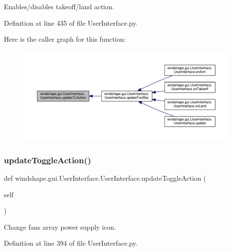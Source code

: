 \begin{DoxyVerb}Enables/disables takeoff/land action.\end{DoxyVerb}
 

Definition at line 435 of file User\+Interface.\+py.

Here is the caller graph for this function\+:\nopagebreak
\begin{figure}[H]
\begin{center}
\leavevmode
\includegraphics[width=350pt]{classwindshape_1_1gui_1_1_user_interface_1_1_user_interface_a26806922c4bfbbbbbffe85dfcf85e614_icgraph}
\end{center}
\end{figure}
\mbox{\label{classwindshape_1_1gui_1_1_user_interface_1_1_user_interface_ad5d42b4891098687b296ef6893d7274d}} 
\subsubsection{\texorpdfstring{update\+Toggle\+Action()}{updateToggleAction()}}
{\footnotesize\ttfamily def windshape.\+gui.\+User\+Interface.\+User\+Interface.\+update\+Toggle\+Action (\begin{DoxyParamCaption}\item[{}]{self }\end{DoxyParamCaption})}

\begin{DoxyVerb}Change fans array power supply icon.\end{DoxyVerb}
 

Definition at line 394 of file User\+Interface.\+py.

